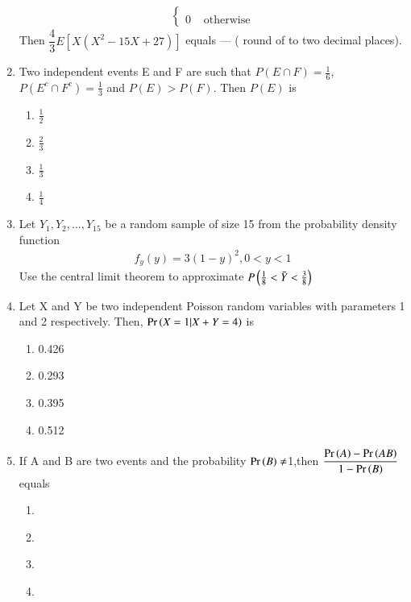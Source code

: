 \documentclass[journal,12pt,twocolumn]{IEEEtran}
\begin{document}
\begin{enumerate}
\begin{align}
\begin{cases}
\\
0 & \text{ otherwise}
\end{cases}
\end{align}
Then $\dfrac{4}{3} E [X(X^2 -15X + 27 ) ] $ equals --- ( round of to two decimal places). \\
\solution
  
%
\item Two independent events E and F are such that $P(E\cap F) = \displaystyle\frac{1}{6}$,$P(E^c\cap F^c)=\displaystyle\frac{1}{3}$ and $P(E)>P(F)$. Then $P(E)$ is
\begin{enumerate}[label=(\Alph*)]
    \item $\displaystyle\frac{1}{2}$\\
    \item $\displaystyle\frac{2}{3}$\\
    \item $\displaystyle\frac{1}{3}$\\
    \item $\displaystyle\frac{1}{4}$
\end{enumerate}
%
\solution
  
%
\item Let $Y_{1},Y_{2},...,Y_{15}$ be a random sample of size 15 from the probability density function 
\begin{align}
\tag{Eq:1}
    f_{y}(y)=3(1-y)^{2} , 0<y<1
\end{align}
Use the central limit theorem to approximate $P\left(\frac{1}{8}<\Bar{Y}<\frac{3}{8}\right)$
%
\solution
  
%
\item Let X and Y be two independent Poisson random variables with parameters 1 and 2 respectively. Then, $\Pr\left(X=1 | X+Y = 4\right)$ is 
\begin{enumerate}[label=\Alph*)]
    \item 0.426
    \item 0.293
    \item 0.395
    \item 0.512
\end{enumerate}
%
\solution
  
%
\item If A and B are two events and the 
probability $\Pr\left(B\right)\neq$1,then  
$\dfrac{\Pr\left(A\right)-\Pr\left(A B\right)}{1-\Pr\left(B\right)}$ equals \\
\begin{enumerate}
    \item {}\\
    \item {}\\
    \item {}\\
    \item {}\\
\end{enumerate}   
%
\solution
  

\end{enumerate}
\end{document}
